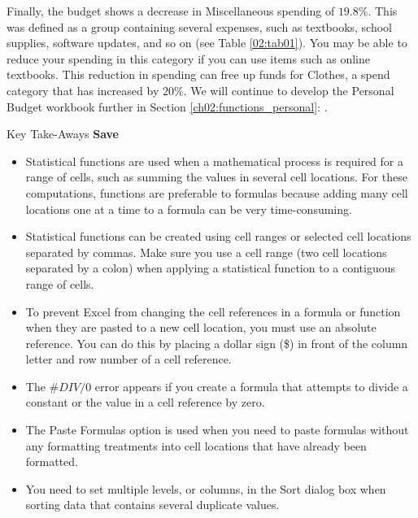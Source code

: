 Finally, the budget shows a decrease in Miscellaneous spending of $ 19.8\% $. This was defined as a group containing several expenses, such as textbooks, school supplies, software updates, and so on (see Table \ref{02:tab01}). You may be able to reduce your spending in this category if you can use items such as online textbooks. This reduction in spending can free up funds for Clothes, a spend category that has increased by $ 20\% $. We will continue to develop the Personal Budget workbook further in Section \ref{ch02:functions_personal}: .

\begin{center}
	\begin{tkwbox}{Key Take-Aways}
		\textbf{Save}
		\\
		\begin{itemize}
			\setlength{\itemsep}{0pt}
			\setlength{\parskip}{0pt}
			\setlength{\parsep}{0pt}
			
			\item Statistical functions are used when a mathematical process is required for a range of cells, such as summing the values in several cell locations. For these computations, functions are preferable to formulas because adding many cell locations one at a time to a formula can be very time-consuming.
			\item Statistical functions can be created using cell ranges or selected cell locations separated by commas. Make sure you use a cell range (two cell locations separated by a colon) when applying a statistical function to a
			contiguous range of cells.
			\item To prevent Excel from changing the cell references in a formula or function when they are pasted to a new cell location, you must use an absolute reference. You can do this by placing a dollar sign (\$) in front of the column letter and row number of a cell reference.
			\item The $ \#DIV/0 $ error appears if you create a formula that attempts to divide a constant or the value in a cell reference by zero.
			\item The Paste Formulas option is used when you need to paste formulas without any formatting treatments into cell locations that have already been formatted.
			\item You need to set multiple levels, or columns, in the Sort dialog box when sorting data that contains several duplicate values.
			
		\end{itemize}
	\end{tkwbox}
\end{center}

